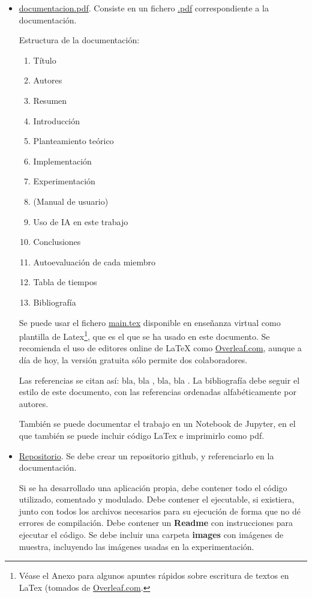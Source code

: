 \documentclass[a4paper]{article}
\theoremstyle{plain} %
\theoremstyle{plain} %
\begin{document}
 \begin{itemize}
\item \url{documentacion.pdf}. Consiste en un fichero \url{.pdf} correspondiente a la documentación. 

Estructura de la documentación:

\begin{enumerate}
\item[]  Título
\item[]  Autores
\item[]  Resumen
\item  Introducción 
\item  Planteamiento teórico 
\item  Implementación
\item  Experimentación
\item  (Manual de usuario)
\item Uso de IA en este trabajo
\item  Conclusiones
\item Autoevaluación de cada miembro
\item  Tabla de tiempos
\item[]  Bibliografía
\end{enumerate}

Se puede usar el fichero \url{main.tex} disponible en enseñanza virtual como plantilla de Latex\footnote{Véase el Anexo para algunos apuntes rápidos sobre escritura de textos en LaTex (tomados de \url{Overleaf.com}.}, que es el que se ha usado en este documento. Se recomienda el uso de editores online de LaTeX como \url{Overleaf.com}, aunque a día de hoy, la versión gratuita sólo permite dos colaboradores.

Las referencias se citan así:
bla, bla \cite{articulopomeranz}, bla, bla \cite{nuestrorepo}. La bibliografía
debe seguir el estilo de este documento, con las referencias ordenadas alfabéticamente por autores.

También se puede documentar el trabajo en un Notebook de Jupyter, en el que también se puede incluir código LaTex e imprimirlo como pdf.

\item \url{Repositorio}. Se debe crear un repositorio github, y referenciarlo en la documentación. 

Si se ha desarrollado una aplicación propia, debe contener todo el código utilizado, comentado y modulado. Debe contener el ejecutable, si existiera, junto con todos los archivos necesarios para su ejecución de forma que no dé errores de compilación.
Debe contener un {\bf Readme} con instrucciones para ejecutar el código.
Se debe incluir una carpeta \textbf{images} con imágenes de muestra, incluyendo las imágenes usadas en la experimentación.


\end{itemize}
\end{document}
